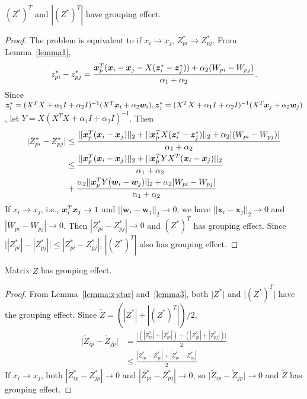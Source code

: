 \begin{lemma}
\label{lemma3}
$(Z^*)^T$ and $|(Z^*)^T|$ have grouping effect. 
\begin{proof}
The problem is equivalent to if $x_i \rightarrow x_j$, $Z^*_{pi} \rightarrow Z^*_{pj}$.
From Lemma~\ref{lemma1},
\begin{equation}
\nonumber
z_{pi}^*-z_{pj}^* = \frac{\bm{x}_p^T ( \bm{x}_i - \bm{x}_j - X(\bm{z}_i^*-\bm{z}_j^*)) + \alpha_2 (W_{pi}-W_{pj})}{\alpha_1+\alpha_2}.
\end{equation}
Since $\bm{z}_i^* = (X^TX + \alpha_1I + \alpha_2I)^{-1}(X^T\bm{x}_i+\alpha_2\bm{w}_i),\bm{z}_j^* = (X^TX + \alpha_1I + \alpha_2I)^{-1}(X^T\bm{x}_j+\alpha_2\bm{w}_j)$,
let $Y = X(X^TX + \alpha_1I + \alpha_2I)^{-1}$. Then
\begin{equation}
\begin{split}
|Z_{pi}^*-Z_{pj}^*| & \leq \frac{||\bm{x}_p^T(\bm{x}_i - \bm{x}_j)||_2 + ||\bm{x}_p^TX(\bm{z}_i^*-\bm{z}_j^*)||_2 + \alpha_2 |(W_{pi}-W_{pj})|}{\alpha_1+\alpha_2}\\
& \leq \frac{||\bm{x}_p^T(\bm{x}_i - \bm{x}_j)||_2 + ||\bm{x}_p^TYX^T(\bm{x}_i-\bm{x}_j)||_2}{\alpha_1+\alpha_2}\\
& + \frac{\alpha_2||\bm{x}_p^TY(\bm{w}_i - \bm{w}_j)||_2 + \alpha_2 |W_{pi}-W_{pj}|}{\alpha_1+\alpha_2}\\
\end{split}
\end{equation}
If $x_i \rightarrow x_j$, i.e., $\bm{x}_i^T\bm{x}_j \rightarrow 1$ and $||\bm{w}_i - \bm{w}_j||_2 \rightarrow 0$, 
we have
$||\bm{x}_i - \bm{x}_j||_2 \rightarrow 0$ and $|W_{pi}-W_{pj}| \rightarrow 0$.
Then $|Z_{pi}^*-Z_{pj}^*| \rightarrow 0$ and
$(Z^*)^T$ has grouping effect.
Since $\bigl||Z_{pi}^*|-|Z_{pj}^*|\bigr| \leq |Z_{pi}^*-Z_{pj}^*|$, $|(Z^*)^T|$ also has grouping effect.
\end{proof}
\end{lemma}

\begin{lemma}
\label{lemma4}
Matrix $\tilde{Z}$ has grouping effect. 
\begin{proof}
From Lemma~\ref{lemma:z-star} and~\ref{lemma3},
both $\lvert Z^*\rvert$ and $\lvert (Z^*)^T\rvert$ have the grouping effect.
Since $\tilde{Z} = (|Z^*|+|(Z^*)^T|)/2$,
\begin{equation}
\begin{split}
\lvert \tilde{Z}_{ip} - \tilde{Z}_{jp}\rvert & = \frac{\bigl| (|Z^*_{ip}|+|Z^*_{pi}|) - (|Z^*_{jp}|+|Z^*_{pj}|)\bigr|}{2} \\
& \leq \frac{|Z_{ip}^*-Z_{jp}^*| + |Z_{pi}^*-Z_{pj}^*|}{2}
\end{split}
\end{equation}
If $x_i \rightarrow x_j$,
both $|Z_{ip}^*-Z_{jp}^*| \rightarrow 0$ and $|Z_{pi}^*-Z_{pj}^*| \rightarrow 0$,
so $\lvert \tilde{Z}_{ip} - \tilde{Z}_{jp}\rvert \rightarrow 0$ and
$\tilde{Z}$ has grouping effect.
\end{proof}
\end{lemma}




